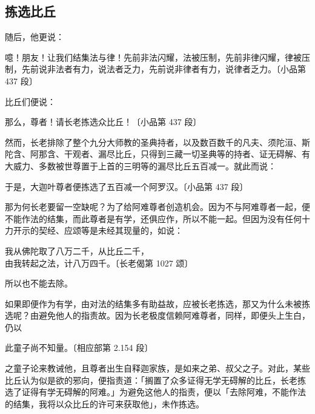 \subsection*{拣选比丘}

随后，他更说：

\begin{quoting}噫！朋友！让我们结集法与律！先前非法闪耀，法被压制，先前非律闪耀，律被压制，先前说非法者有力，说法者乏力，先前说非律者有力，说律者乏力。{\bluefootnotesize 〔小品第 437 段〕}\end{quoting}

比丘们便说：

\begin{quoting}那么，尊者！请长老拣选众比丘！{\bluefootnotesize 〔小品第 437 段〕}\end{quoting}

然而，长老排除了整个九分大师教的圣典持者，以及数百数千的凡夫、须陀洹、斯陀含、阿那含、干观者、漏尽比丘，只得到三藏一切圣典等的持者、证无碍解、有大威力、多数被世尊置于上首的三明等的漏尽比丘五百减一。就此而说：

\begin{quoting}于是，大迦叶尊者便拣选了五百减一个阿罗汉。{\bluefootnotesize 〔小品第 437 段〕}\end{quoting}

那为何长老要留一空缺呢？为了给阿难尊者创造机会。因为不与阿难尊者一起，便不能作法的结集，而此尊者是有学，还俱应作，所以不能一起。但因为没有任何十力开示的契经、应颂等是未经其现量的，如说：

\begin{quoting}我从佛陀取了八万二千，从比丘二千，\\由我转起之法，计八万四千。{\bluefootnotesize 〔长老偈第 1027 颂〕}\end{quoting}

所以也不能去除。

如果即便作为有学，由对法的结集多有助益故，应被长老拣选，那又为什么未被拣选呢？由避免他人的指责故。因为长老极度信赖阿难尊者，同样，即便头上生白，仍以

\begin{quoting}此童子尚不知量。{\bluefootnotesize 〔相应部第 2.154 段〕}\end{quoting}

之童子论来教诫他，且尊者出生自释迦家族，是如来之弟、叔父之子。对此，某些比丘认为似是欲的邪向，便指责道：「搁置了众多证得无学无碍解的比丘，长老拣选了证得有学无碍解的阿难。」为避免这他人的指责，便以「去除阿难，不能作法的结集，我将以众比丘的许可来获取他」，未作拣选。


